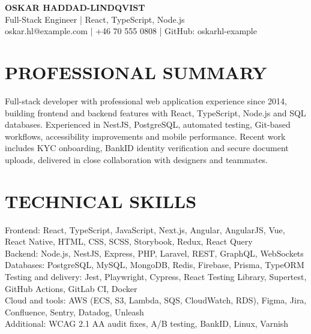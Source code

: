 \documentclass[11pt,a4paper]{article}
\begin{document}
\begin{center}
{\LARGE\bfseries OSKAR HADDAD-LINDQVIST}\\
\vspace{0.25em}
{\large Full-Stack Engineer | React, TypeScript, Node.js}\\
\vspace{0.2em}
oskar.hl@example.com | +46 70 555 0808 | GitHub: oskarhl-example
\end{center}

\section*{PROFESSIONAL SUMMARY}
Full-stack developer with professional web application experience since 2014, building frontend and backend features with React, TypeScript, Node.js and SQL databases. Experienced in NestJS, PostgreSQL, automated testing, Git-based workflows, accessibility improvements and mobile performance. Recent work includes KYC onboarding, BankID identity verification and secure document uploads, delivered in close collaboration with designers and teammates.

\section*{TECHNICAL SKILLS}
Frontend: React, TypeScript, JavaScript, Next.js, Angular, AngularJS, Vue, React Native, HTML, CSS, SCSS, Storybook, Redux, React Query\\
Backend: Node.js, NestJS, Express, PHP, Laravel, REST, GraphQL, WebSockets\\
Databases: PostgreSQL, MySQL, MongoDB, Redis, Firebase, Prisma, TypeORM\\
Testing and delivery: Jest, Playwright, Cypress, React Testing Library, Supertest, GitHub Actions, GitLab CI, Docker\\
Cloud and tools: AWS (ECS, S3, Lambda, SQS, CloudWatch, RDS), Figma, Jira, Confluence, Sentry, Datadog, Unleash\\
Additional: WCAG 2.1 AA audit fixes, A/B testing, BankID, Linux, Varnish
\end{document}
